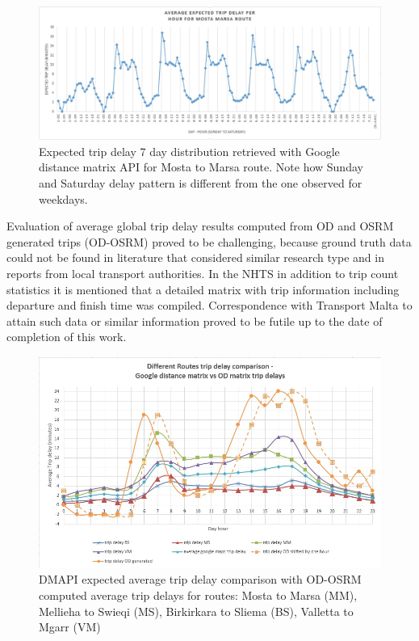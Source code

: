 \documentclass[12pt, a4paper]{report}
\theoremstyle{definition}
\theoremstyle{definition}%
\theoremstyle{definition}%
\theoremstyle{definition}%
\theoremstyle{definition}%
\theoremstyle{definition}%
\begin{document}
\begin{figure}[!]	
	\includegraphics[scale=0.5]{trip_delay_mosta_marsa.jpg}
	\centering
	\caption[Average expected trip delay - 7 day distibution]{Expected trip delay 7 day distribution retrieved with Google distance matrix API for Mosta to Marsa route. Note how Sunday and Saturday delay pattern is different from the one observed for weekdays.}
	\label{fig:trip_delay_mosta_marsa}
\end{figure}

Evaluation of average global trip delay results computed from OD and OSRM generated trips (OD-OSRM) proved to be challenging, because ground truth data could not be found in literature that considered similar research type and in reports from local transport authorities. In the NHTS \cite{malta2011national} in addition to trip count statistics it is mentioned that a detailed matrix with trip information including departure and finish time was compiled. Correspondence with Transport Malta to attain such data or similar information proved to be futile up to the date of completion of this work. 


\begin{figure}[h]	
	\includegraphics[scale=0.7]{trip_delay_comparison.jpg}
	\centering
	\caption[Trip delay line chart DMAPI vs OD-OSRM]{DMAPI expected average trip delay comparison with OD-OSRM computed average trip delays for routes: Mosta to Marsa (MM), Mellieha to Swieqi (MS), Birkirkara to Sliema (BS), Valletta to Mgarr (VM)}
	\label{fig:trip_delay_google_vs_mine}
\end{figure}
\end{document}
